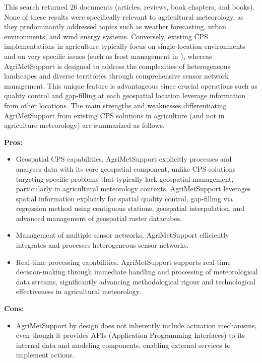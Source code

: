 \documentclass[authoryear,preprint,review,12pt]{elsarticle}
\newcommand{\statusblock}[3]{
    \ifthenelse{\equal{#2}{todo}}
        {\textcolor{red}{#1 (TO DO): #3}}
        {}
    \ifthenelse{\equal{#2}{wip}}
        {\textcolor{magenta}{#1 (IN PROGRESS): #3}}
        {}
    \ifthenelse{\equal{#2}{update}}
        {\textcolor{blue}{#1 (UPDATE): #3}}
        {}
    \ifthenelse{\equal{#2}{review}}
        {\textcolor{cyan}{#1 (REVIEW): #3}}
        {}
    \ifthenelse{\equal{#2}{done}}
        {\textcolor{PineGreen}{#1 (READY): #3}}
        {}
}
\begin{document}
This search returned 26 documents (articles, reviews, book chapters, and books). 
None of these results were specifically relevant to agricultural meteorology, as they predominantly addressed topics such as weather forecasting, urban environments, and wind energy systems. 
Conversely, existing CPS implementations in agriculture typically focus on single-location environments and on very specific issues (such as frost management in \cite{hua25CPS}), whereas Agri\-Met\-Support is designed to address the complexities of heterogeneous landscapes and diverse territories through comprehensive sensor network management. 
This unique feature is advantageous since crucial operations such as quality control and gap-filling at each geospatial location leverage information from other locations.
The main strengths and weaknesses differentiating Agri\-Met\-Support from existing CPS solutions in agriculture (and not in agriculture meteorology) are summarized as follows.

\textbf{Pros:}
\begin{itemize}
    \item %
    Geospatial CPS capabilities. Agri\-Met\-Support explicitly processes and analyses data with its core geospatial component, unlike CPS solutions targeting specific problems that typically lack geospatial management, particularly in agricultural meteorology contexts. Agri\-Met\-Support leverages spatial information explicitly for spatial quality control, gap-filling via regression method using contiguous stations, geospatial interpolation, and advanced management of geospatial raster datacubes.
    \item Management of multiple sensor networks. Agri\-Met\-Support efficiently integrates and processes heterogeneous sensor networks.%
    \item Real-time processing capabilities. Agri\-Met\-Support supports real-time decision-making through immediate handling and processing of meteorological data streams, significantly advancing methodological rigour and technological effectiveness in agricultural meteorology.
\end{itemize}
\textbf{Cons:}

\begin{itemize}
    \item Agri\-Met\-Support by design does not inherently include actuation mechanisms, even though it provides APIs (Application Programming Interfaces) to its internal data and modeling components, enabling external services to implement actions.%
\end{itemize}
\end{document}
